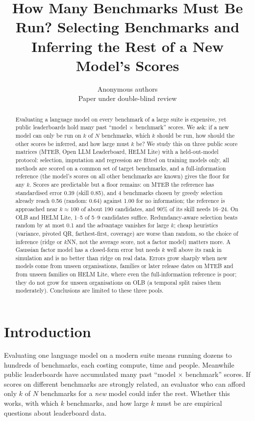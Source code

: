 \documentclass{article}
\title{How Many Benchmarks Must Be Run? Selecting Benchmarks and Inferring the Rest of a New Model's Scores}
\author{Anonymous authors\\Paper under double-blind review}
\begin{document}
\maketitle

\begin{abstract}
Evaluating a language model on every benchmark of a large suite is expensive, yet public leaderboards hold many past ``model $\times$ benchmark'' scores. We ask: if a new model can only be run on $k$ of $N$ benchmarks, which $k$ should be run, how should the other scores be inferred, and how large must $k$ be? We study this on three public score matrices (MTEB, Open LLM Leaderboard, HELM Lite) with a held-out-model protocol: selection, imputation and regression are fitted on training models only, all methods are scored on a common set of target benchmarks, and a full-information reference (the model's scores on all other benchmarks are known) gives the floor for any $k$. Scores are predictable but a floor remains: on MTEB the reference has standardised error 0.39 (skill 0.85), and 4 benchmarks chosen by greedy selection already reach 0.56 (random: 0.64) against 1.00 for no information; the reference is approached near $k\approx100$ of about 190 candidates, and 90\% of its skill needs 16--24. On OLB and HELM Lite, 1--5 of 5--9 candidates suffice. Redundancy-aware selection beats random by at most 0.1 and the advantage vanishes for large $k$; cheap heuristics (variance, pivoted QR, farthest-first, coverage) are worse than random, so the choice of inference (ridge or $k$NN, not the average score, not a factor model) matters more. A Gaussian factor model has a closed-form error but needs $k$ well above its rank in simulation and is no better than ridge on real data. Errors grow sharply when new models come from unseen organisations, families or later release dates on MTEB and from unseen families on HELM Lite, where even the full-information reference is poor; they do not grow for unseen organisations on OLB (a temporal split raises them moderately). Conclusions are limited to these three pools.
\end{abstract}

\section{Introduction}
\label{sec:intro}
Evaluating one language model on a modern suite means running dozens to hundreds of benchmarks, each costing compute, time and people. Meanwhile public leaderboards have accumulated many past ``model $\times$ benchmark'' scores. If scores on different benchmarks are strongly related, an evaluator who can afford only $k$ of $N$ benchmarks for a \emph{new} model could infer the rest. Whether this works, with which $k$ benchmarks, and how large $k$ must be are empirical questions about leaderboard data.
\end{document}
